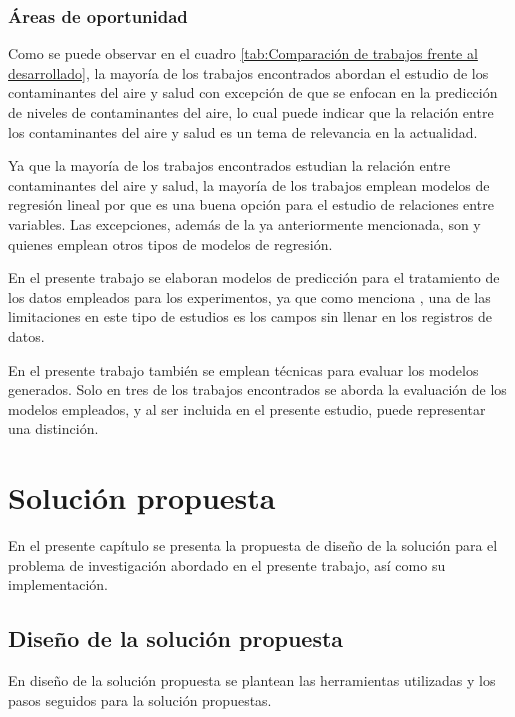 \subsection{Áreas de oportunidad}
Como se puede observar en el cuadro \ref{tab:Comparación de trabajos frente al desarrollado}, la mayoría de los trabajos encontrados abordan el estudio de los contaminantes del aire y salud con excepción de \citet{r13} que se enfocan en la predicción de niveles de contaminantes del aire, lo cual puede indicar que la relación entre los contaminantes del aire y salud es un tema de relevancia en la actualidad. 

Ya que la mayoría de los trabajos encontrados estudian la relación entre contaminantes del aire y salud, la mayoría de los trabajos emplean modelos de regresión lineal por que es una buena opción para el estudio de relaciones entre variables. Las excepciones, además de la ya anteriormente mencionada, son \citet{r17} y \citet{r18} quienes emplean otros tipos de modelos de regresión.

En el presente trabajo se elaboran modelos de predicción para el tratamiento de los datos empleados para los experimentos, ya que como menciona \citet{r15}, una de las limitaciones en este tipo de estudios es los campos sin llenar en los registros de datos.

En el presente trabajo también se emplean técnicas para evaluar los modelos generados. Solo en tres de los trabajos encontrados se aborda la evaluación de los modelos empleados, y al ser incluida en el presente estudio, puede representar una distinción.

\chapter{Solución propuesta}
En el presente capítulo se presenta la propuesta de diseño de la solución para el problema de investigación abordado en el presente trabajo, así como su implementación.

\section{Diseño de la solución propuesta} \label{Diseño de la solución propuesta}
En diseño de la solución propuesta se plantean las herramientas utilizadas y los pasos seguidos para la solución propuestas.

